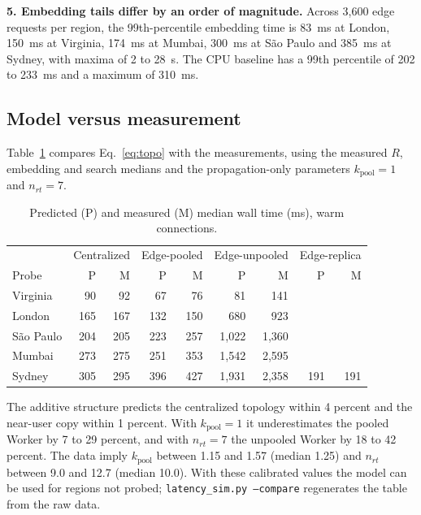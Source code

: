 \documentclass[conference]{IEEEtran}
\newcommand{\code}[1]{\texttt{#1}}
\begin{document}
\textbf{5. Embedding tails differ by an order of magnitude.} Across 3{,}600 edge requests per
region, the 99th-percentile embedding time is 83~ms at London, 150~ms at Virginia, 174~ms at
Mumbai, 300~ms at S\~ao Paulo and 385~ms at Sydney, with maxima of 2 to 28~s. The CPU baseline has
a 99th percentile of 202 to 233~ms and a maximum of 310~ms.

\subsection{Model versus measurement}\label{sec:mvm}
Table~\ref{tab:mvm} compares Eq.~\eqref{eq:topo} with the measurements, using the measured $R$,
embedding and search medians and the propagation-only parameters $k_{\mathrm{pool}} = 1$ and
$n_{rt} = 7$.

\begin{table}[t]
\caption{Predicted (P) and measured (M) median wall time (ms), warm connections.}
\label{tab:mvm}
\centering
\footnotesize
\setlength{\tabcolsep}{3pt}
\begin{tabular}{@{}l r r r r r r r r@{}}
\toprule
 & \multicolumn{2}{c}{Centralized} & \multicolumn{2}{c}{Edge-pooled} & \multicolumn{2}{c}{Edge-unpooled} & \multicolumn{2}{c}{Edge-replica} \\
Probe & P & M & P & M & P & M & P & M \\
\midrule
Virginia    & 90  & 92  & 67  & 76  & 81      & 141     &     &     \\
London      & 165 & 167 & 132 & 150 & 680     & 923     &     &     \\
S\~ao Paulo & 204 & 205 & 223 & 257 & 1{,}022 & 1{,}360 &     &     \\
Mumbai      & 273 & 275 & 251 & 353 & 1{,}542 & 2{,}595 &     &     \\
Sydney      & 305 & 295 & 396 & 427 & 1{,}931 & 2{,}358 & 191 & 191 \\
\bottomrule
\end{tabular}
\end{table}

The additive structure predicts the centralized topology within 4 percent and the near-user copy
within 1 percent. With $k_{\mathrm{pool}} = 1$ it underestimates the pooled Worker by 7 to 29
percent, and with $n_{rt} = 7$ the unpooled Worker by 18 to 42 percent. The data imply
$k_{\mathrm{pool}}$ between 1.15 and 1.57 (median 1.25) and $n_{rt}$ between 9.0 and 12.7 (median
10.0). With these calibrated values the model can be used for regions not probed;
\code{latency\_sim.py --compare} regenerates the table from the raw data.
\end{document}

